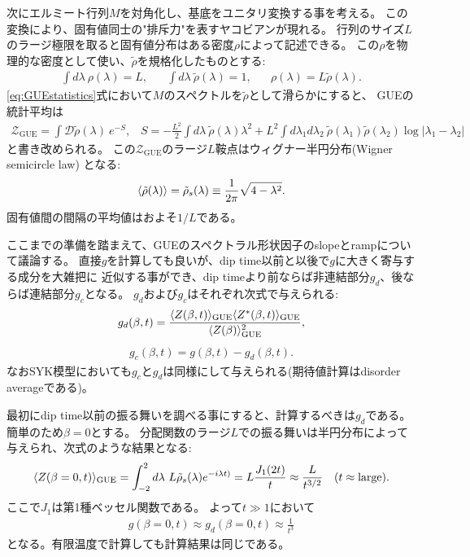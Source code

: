 次にエルミート行列$M$を対角化し、基底をユニタリ変換する事を考える。
この変換により、固有値同士の"排斥力"を表すヤコビアンが現れる。
行列のサイズ$L$のラージ極限を取ると固有値分布はある密度$\rho$によって記述できる。
この$\rho$を物理的な密度として使い、$\tilde{\rho}$を規格化したものとする:
\begin{align}
	\int d\lambda\ \rho(\lambda) = L,\hspace{20pt}
	\int d\lambda\ \tilde{\rho}(\lambda) = 1,\hspace{20pt}
	\rho(\lambda) = L\tilde{\rho}(\lambda).
\end{align}
\eqref{eq:GUEstatistics}式において$M$のスペクトルを$\tilde{\rho}$として滑らかにすると、
GUEの統計平均は
\begin{align}
	\mathcal{Z}_{\mathrm{GUE}} = \int \mathcal{D}\tilde{\rho}(\lambda)\ e^{-S},
	\hspace{10pt}
	S 
	= -\frac{L^2}{2} \int d\lambda\ \tilde{\rho}(\lambda)\lambda^2
	+ L^2 \int d\lambda_1 d\lambda_2\ \tilde{\rho}(\lambda_1)\tilde{\rho}(\lambda_2)
		\log|\lambda_1 - \lambda_2|
	\label{eq:GUEstatistics_in_large_L}
\end{align}
と書き改められる。
この$\mathcal{Z}_{\mathrm{GUE}}$のラージ$L$鞍点はウィグナー半円分布(Wigner semicircle law)
となる:
\begin{align}
	\langle \tilde{\rho}(\lambda) \rangle = \tilde{\rho}_s(\lambda)\equiv
	\frac{1}{2\pi}\sqrt{4 - \lambda^2}.
	\label{eq:semicircle_law}
\end{align}
固有値間の間隔の平均値はおよそ$1/L$である。

ここまでの準備を踏まえて、GUEのスペクトラル形状因子のslopeとrampについて議論する。
直接$g$を計算しても良いが、dip time以前と以後で$g$に大きく寄与する成分を大雑把に
近似する事ができ、dip timeより前ならば非連結部分$g_d$、後ならば連結部分$g_c$となる。
$g_d$および$g_c$はそれぞれ次式で与えられる:
\begin{align}
	g_d(\beta, t)
	= \frac{\langle Z(\beta, t) \rangle_{\mathrm{GUE}}\langle Z^*(\beta, t) \rangle_{\mathrm{GUE}}}
		{\langle Z(\beta) \rangle_{\mathrm{GUE}}^2},
	\label{eq:disconnected_piece}
\end{align}
\begin{align}
	g_c(\beta, t) = g(\beta, t) - g_d(\beta, t).
	\label{eq:connected_piece}
\end{align}
なおSYK模型においても$g_c$と$g_d$は同様にして与えられる(期待値計算はdisorder averageである)。

最初にdip time以前の振る舞いを調べる事にすると、計算するべきは$g_d$である。
簡単のため$\beta = 0$とする。
分配関数のラージ$L$での振る舞いは半円分布によって与えられ、次式のような結果となる:
\begin{align}
	\langle Z(\beta=0, t) \rangle_{\mathrm{GUE}}
	= \int_{-2}^2 d\lambda\ L\tilde{\rho}_s(\lambda)e^{-i\lambda t)}
	= L\frac{J_1(2t)}{t}
	\approx \frac{L}{t^{3/2}}
	\hspace{10pt}(t \approx \mathrm{large}).
\end{align}
ここで$J_1$は第1種ベッセル関数である。
よって$t \gg 1$において
\begin{align}
	g(\beta = 0, t) \approx g_d(\beta = 0, t) \approx \frac{1}{t^3}
	\label{eq:late_time_slope_in_RMT}
\end{align}
となる。有限温度で計算しても計算結果は同じである。


